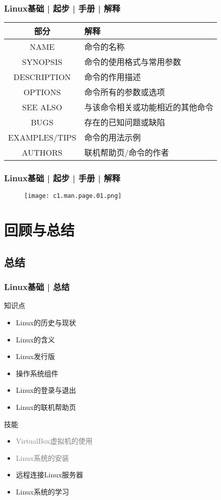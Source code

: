 \begin{frame}
  \frametitle{Linux基础 | 起步 | 手册 | 解释}
  \begin{table}
    \centering
    \begin{tabular}{cl}
      \hline
      \rowcolor{blue!50}部分 & 解释\\
      \hline
      NAME & 命令的名称\\
      SYNOPSIS & 命令的使用格式与常用参数\\
      DESCRIPTION & 命令的作用描述\\
      OPTIONS & 命令所有的参数或选项\\
      SEE ALSO & 与该命令相关或功能相近的其他命令\\
      BUGS & 存在的已知问题或缺陷\\
      EXAMPLES/TIPS & 命令的用法示例\\
      AUTHORS & 联机帮助页/命令的作者\\
      \hline
    \end{tabular}
  \end{table}
\end{frame}

\begin{frame}
  \frametitle{Linux基础 | 起步 | 手册 | 解释}
  \begin{figure}
    \centering
    \texttt{[image: c1.man.page.01.png]}
  \end{figure}
\end{frame}

\section{回顾与总结}
\subsection{总结}
\begin{frame}
  \frametitle{Linux基础 | 总结}
  \begin{block}{知识点}
    \begin{itemize}
      \item Linux的历史与现状
      \item Linux的含义
      \item Linux发行版
      \item 操作系统组件
      \item Linux的登录与退出
      \item Linux的联机帮助页
    \end{itemize}
  \end{block}
  \begin{block}{技能}
    \begin{itemize}
      \item \textcolor{gray}{VirtualBox虚拟机的使用}
      \item \textcolor{gray}{Linux系统的安装}
      \item 远程连接Linux服务器
      \item Linux系统的学习
    \end{itemize}
  \end{block}
\end{frame}

